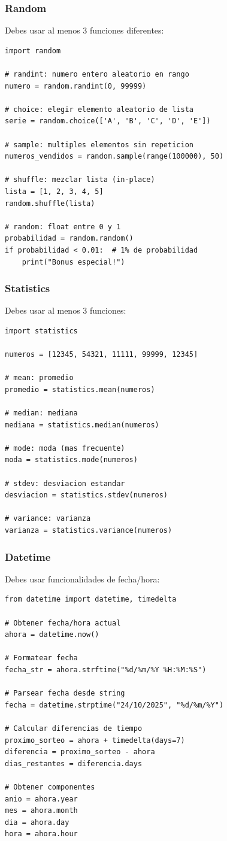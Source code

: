 \documentclass[12pt,a4paper]{article}
\begin{document}
\subsubsection{Random}

Debes usar al menos 3 funciones diferentes:

\begin{lstlisting}
import random

# randint: numero entero aleatorio en rango
numero = random.randint(0, 99999)

# choice: elegir elemento aleatorio de lista
serie = random.choice(['A', 'B', 'C', 'D', 'E'])

# sample: multiples elementos sin repeticion
numeros_vendidos = random.sample(range(100000), 50)

# shuffle: mezclar lista (in-place)
lista = [1, 2, 3, 4, 5]
random.shuffle(lista)

# random: float entre 0 y 1
probabilidad = random.random()
if probabilidad < 0.01:  # 1% de probabilidad
    print("Bonus especial!")
\end{lstlisting}

\subsubsection{Statistics}

Debes usar al menos 3 funciones:

\begin{lstlisting}
import statistics

numeros = [12345, 54321, 11111, 99999, 12345]

# mean: promedio
promedio = statistics.mean(numeros)

# median: mediana
mediana = statistics.median(numeros)

# mode: moda (mas frecuente)
moda = statistics.mode(numeros)

# stdev: desviacion estandar
desviacion = statistics.stdev(numeros)

# variance: varianza
varianza = statistics.variance(numeros)
\end{lstlisting}

\subsubsection{Datetime}

Debes usar funcionalidades de fecha/hora:

\begin{lstlisting}
from datetime import datetime, timedelta

# Obtener fecha/hora actual
ahora = datetime.now()

# Formatear fecha
fecha_str = ahora.strftime("%d/%m/%Y %H:%M:%S")

# Parsear fecha desde string
fecha = datetime.strptime("24/10/2025", "%d/%m/%Y")

# Calcular diferencias de tiempo
proximo_sorteo = ahora + timedelta(days=7)
diferencia = proximo_sorteo - ahora
dias_restantes = diferencia.days

# Obtener componentes
anio = ahora.year
mes = ahora.month
dia = ahora.day
hora = ahora.hour
\end{lstlisting}
\end{document}
